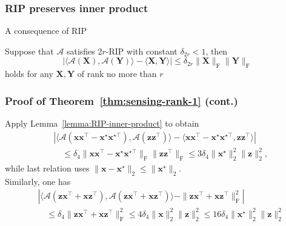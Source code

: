 \documentclass[compress,
mathserif,wide,%
]{beamer}
\begin{document}
\begin{frame}
	\frametitle{RIP preserves inner product}
	
	A consequence of RIP 
	
	\vfill 
	\begin{lemma}\label{lemma:RIP-inner-product}
	Suppose that $\mathcal{A}$ satisfies 2$r$-RIP with constant $\delta_{2r} < 1$, then 
	\[
		\left| \langle \mathcal{A}(\bm{X}), \mathcal{A}(\bm{Y}) \rangle - \langle \bm{X}, \bm{Y} \rangle \right| \leq \delta_{2r} \| \bm{X} \|_{\mathrm{F}} \| \bm{Y} \|_{\mathrm{F}}
	\]
	holds for any $\bm{X}, \bm{Y}$ of rank no more than $r$
	\end{lemma}
\end{frame}




\begin{frame}
	\frametitle{Proof of Theorem~\ref{thm:sensing-rank-1} (cont.)}
	
	Apply Lemma~\ref{lemma:RIP-inner-product} to obtain
	\begin{align*}
		& \left|  \langle \mathcal{A} (\bm{x} \bm{x}^\top  - \bm{x}^{\star} \bm{x}^{\star \top}), \mathcal{A} (\bm{z} \bm{z}^\top ) \rangle - \langle \bm{x} \bm{x}^\top  - \bm{x}^{\star} \bm{x}^{\star \top}, \bm{z} \bm{z}^\top  \rangle \right| \\
		&\quad \leq \delta_{4} \| \bm{x} \bm{x}^\top  - \bm{x}^{\star} \bm{x}^{\star \top} \|_{\mathrm{F}} \| \bm{z} \bm{z}^\top \|_{\mathrm{F}}  \leq 3 \delta_{4} \| \bm{x}^{\star} \|_{2}^{2} \| \bm{z} \|_{2}^{2}, 
	\end{align*}
	while last relation uses $\|\bm{x} - \bm{x}^\star \|_{2} \leq \| \bm{x}^\star \|_{2}$. \\
	
	\vfill
	Similarly, one has
	\begin{align*}
		& \left|  \langle \mathcal{A} (\bm{z} \bm{x}^\top  + \bm{x} \bm{z}^{\top}), \mathcal{A} (\bm{z} \bm{x}^\top  + \bm{x} \bm{z}^{\top}) \rangle -  \| \bm{z} \bm{x}^\top  + \bm{x} \bm{z}^{\top} \|_{\mathrm{F}}^{2} \right| \\
		&\quad \leq \delta_{4} \| \bm{z} \bm{x}^\top  + \bm{x} \bm{z}^{\top} \|_{\mathrm{F}}^2 \leq 4 \delta_{4} \| \bm{x} \|_{2}^{2} \| \bm{z} \|_{2}^{2} \leq 16 \delta_{4} \| \bm{x}^\star \|_{2}^{2} \| \bm{z} \|_{2}^{2}
	\end{align*}		
	
\end{frame}
\end{document}
